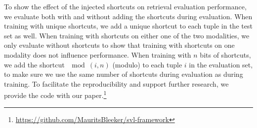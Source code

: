 To show the effect of the injected shortcuts on retrieval evaluation performance, we evaluate both with and without adding the shortcuts during evaluation.
When training with unique shortcuts, we add a unique shortcut to each tuple in the test set as well.
When training with shortcuts on either one of the two modalities, we only evaluate without shortcuts to show that training with shortcuts on one modality does not influence performance.
When training with $n$ bits of shortcuts, we add the shortcut $\mod(i, n)$ (modulo) to each tuple $i$ in the evaluation set, to make sure we use the same number of shortcuts during evaluation as during training.
To facilitate the reproducibility and support further research, we provide the code with our paper.\footnote{ \url{https://github.com/MauritsBleeker/svl-framework}}
